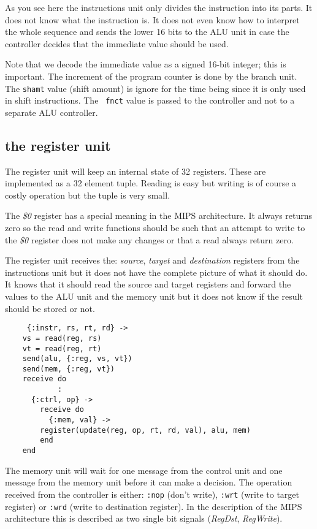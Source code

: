 \documentclass[a4paper,11pt]{article}
\begin{document}
As you see here the instructions unit only divides the instruction
into its parts. It does not know what the instruction is. It does
not even know how to interpret the whole sequence and sends the lower
16 bits to the ALU unit in case the controller decides that the
immediate value should be used.

Note that we decode the immediate value as a signed 16-bit integer;
this is important. The increment of the program counter is done
by the branch unit. The {\tt shamt} value (shift amount) is ignore for
the time being since it is only used in shift instructions. The {\tt
  fnct} value is passed to the controller and not to a separate ALU
controller.


\subsection*{the register unit}

The register unit will keep an internal state of 32 registers. These
are implemented as a 32 element tuple. Reading is easy but writing
is of course a costly operation but the tuple is very small. 

The {\em \$0} register has a special meaning in the MIPS
architecture. It always returns zero so the read and write functions
should be such that an attempt to write to the {\em \$0} register does
not make any changes or that a read always return zero.


The register unit receives the: {\em source}, {\em target} and {\em
  destination} registers from the instructions unit but it does not
have the complete picture of what it should do. It knows that it should
read the source and target registers and forward the values to the ALU
unit and the memory unit but it does not know if the result should be
stored or not.

\begin{verbatim}
     {:instr, rs, rt, rd} ->
	vs = read(reg, rs)
	vt = read(reg, rt)
	send(alu, {:reg, vs, vt})
	send(mem, {:reg, vt})
	receive do
            :
	  {:ctrl, op} ->
	    receive do
	      {:mem, val} ->
		register(update(reg, op, rt, rd, val), alu, mem)
	    end
	end
\end{verbatim}

The memory unit will wait for one message from the control unit and
one message from the memory unit before it can make a decision. The
operation received from the controller is either: {\tt :nop} (don't
write), {\tt :wrt} (write to target register) or {\tt :wrd} (write to
destination register). In the description of the MIPS architecture
this is described as two single bit signals ({\em RegDst}, {\em
  RegWrite}).
\end{document}
